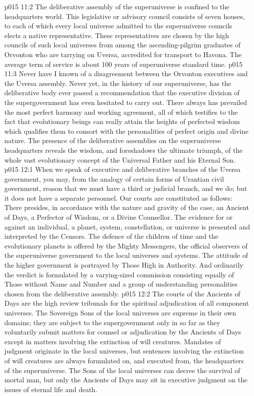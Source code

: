 \vs p015 11:2 The deliberative assembly of the superuniverse is confined to the headquarters world. This legislative or advisory council consists of seven houses, to each of which every local universe admitted to the superuniverse councils elects a native representative. These representatives are chosen by the high councils of such local universes from among the ascending\hyp{}pilgrim graduates of Orvonton who are tarrying on Uversa, accredited for transport to Havona. The average term of service is about 100 years of superuniverse standard time.
\vs p015 11:3 Never have I known of a disagreement between the Orvonton executives and the Uversa assembly. Never yet, in the history of our superuniverse, has the deliberative body ever passed a recommendation that the executive division of the supergovernment has even hesitated to carry out. There always has prevailed the most perfect harmony and working agreement, all of which testifies to the fact that evolutionary beings can really attain the heights of perfected wisdom which qualifies them to consort with the personalities of perfect origin and divine nature. The presence of the deliberative assemblies on the superuniverse headquarters reveals the wisdom, and foreshadows the ultimate triumph, of the whole vast evolutionary concept of the Universal Father and his Eternal Son.
\vs p015 12:1 When we speak of executive and deliberative branches of the Uversa government, you may, from the analogy of certain forms of Urantian civil government, reason that we must have a third or judicial branch, and we do; but it does not have a separate personnel. Our courts are constituted as follows: There presides, in accordance with the nature and gravity of the case, an Ancient of Days, a Perfector of Wisdom, or a Divine Counsellor. The evidence for or against an individual, a planet, system, constellation, or universe is presented and interpreted by the Censors. The defence of the children of time and the evolutionary planets is offered by the Mighty Messengers, the official observers of the superuniverse government to the local universes and systems. The attitude of the higher government is portrayed by Those High in Authority. And ordinarily the verdict is formulated by a varying\hyp{}sized commission consisting equally of Those without Name and Number and a group of understanding personalities chosen from the deliberative assembly.
\vs p015 12:2 The courts of the Ancients of Days are the high review tribunals for the spiritual adjudication of all component universes. The Sovereign Sons of the local universes are supreme in their own domains; they are subject to the supergovernment only in so far as they voluntarily submit matters for counsel or adjudication by the Ancients of Days except in matters involving the extinction of will creatures. Mandates of judgment originate in the local universes, but sentences involving the extinction of will creatures are always formulated on, and executed from, the headquarters of the superuniverse. The Sons of the local universes can decree the survival of mortal man, but only the Ancients of Days may sit in executive judgment on the issues of eternal life and death.

